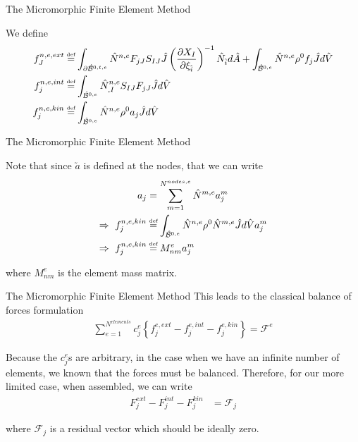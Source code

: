 \documentclass[11pt]{beamer}
\newcommand{\VEC}[1]{\utilde{#1}}
\newcommand\defeq{\mathrel{\stackrel{\makebox[0pt]{\mbox{\normalfont\tiny def}}}{=}}}
\begin{document}
\begin{frame}{The Micromorphic Finite Element Method}

We define
\begin{align*}
f_{J}^{n,e,ext} &\defeq \int_{\partial \hat{\mathcal{B}}^{0,t,e}} \hat{N}^{n,e} F_{jJ} S_{IJ} \hat{J} \left(\frac{\partial X_{I}}{\partial \xi_{\hat{i}}}\right)^{-1} \hat{N}_{\hat{i}} d\hat{A} + \int_{\hat{\mathcal{B}}^{0,e}}  \hat{N}^{n,e} \rho^0 f_j \hat{J} d\hat{V}\\
f_{j}^{n,e,int} &\defeq \int_{\hat{\mathcal{B}}^{0,e}}\hat{N}^{n,e}_{,I} S_{IJ} F_{jJ} \hat{J} d\hat{V}\\
f_{j}^{n,e,kin} &\defeq \int_{\hat{\mathcal{B}}^{0,e}} \hat{N}^{n,e} \rho^0 a_j \hat{J} d\hat{V}\\
\end{align*}

\end{frame}

\begin{frame}{The Micromorphic Finite Element Method}

Note that since $\VEC{a}$ is defined at the nodes, that we can write
\begin{align*}
a_j &= \sum_{m=1}^{N^{nodes,e}} \hat{N}^{m,e} a_j^m\\
\Rightarrow\ f_{j}^{n,e,kin} &\defeq \int_{\hat{\mathcal{B}}^{0,e}} \hat{N}^{n,e} \rho^0 \hat{N}^{m,e} \hat{J} d\hat{V} a_j^m\\
\Rightarrow\ f_{j}^{n,e,kin} &\defeq  M_{nm}^e a_j^m
\end{align*}

where $M_{nm}^e$ is the element mass matrix.

\end{frame}

\begin{frame}{The Micromorphic Finite Element Method}
This leads to the classical balance of forces formulation
\begin{align*}
\sum_{e=1}^{N^{elements}} c_j^e\left\{f_{j}^{e,ext} - f_{j}^{e,int} - f_{j}^{e,kin}\right\} = \mathcal{F}^{e}
\end{align*}

Because the $c_j^e$s are arbitrary, in the case when we have an infinite number of elements, we known that the forces must be balanced. Therefore, for our more limited case, when assembled, we can write
\begin{align*}
F_{j}^{ext} - F_{j}^{int} - F_{j}^{kin} &= \mathcal{F}_j
\end{align*}

where $\mathcal{F}_j$ is a residual vector which should be ideally zero.

\end{frame}
\end{document}
